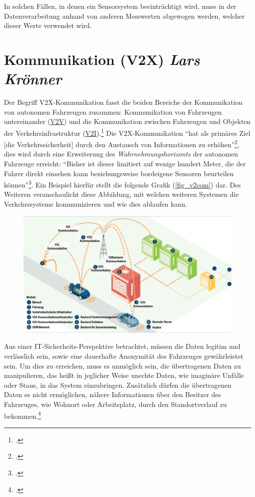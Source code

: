 \documentclass[a4paper, 12pt, openany]{book}
\newcommand\Section[2]{\section[#1 {\scriptsize\itshape#2}]{#1 \footnotesize\itshape#2}}
\begin{document}
                In solchen Fällen, in denen ein Sensorsystem beeinträchtigt wird, muss in der Datenverarbeitung anhand von anderen Messwerten abgewogen werden, welcher dieser Werte verwendet wird.
                
        \Section{Kommunikation (V2X)}{Lars Krönner}
            Der Begriff V2X-Kommunikation fasst die beiden Bereiche der Kommunikation von autonomen Fahrzeugen zusammen: Kommunikation von Fahrzeugen untereinander (\hyperref[V2V]{V2V}) und die Kommunikation zwischen Fahrzeugen und Objekten der Verkehrsinfrastruktur (\hyperref[V2I]{V2I}).\footcite[3]{schmidt2008v2x} Die V2X-Kommunikation \enquote{hat als primäres Ziel [die Verkehrssicherheit] durch den Austausch von Informationen zu erhöhen}\footcite[3]{schmidt2008v2x}, dies wird durch eine Erweiterung des \textit{Wahrnehmungshorizonts} der autonomen Fahrzeuge erreicht: \enquote{Bisher ist dieser limitiert auf wenige hundert Meter, die der Fahrer direkt einsehen kann beziehungsweise bordeigene Sensoren beurteilen können}\footcite[1--15]{schmidt2008v2x}.
            Ein Beispiel hierfür stellt die folgende Grafik (\autoref{fig_v2com}) dar. Des Weiteren veranschaulicht diese Abbildung, mit welchen weiteren Systemen die Verkehrssysteme kommunizieren und wie dies ablaufen kann.
            
            \begin{figure}
                \centering
                \includegraphics[scale=0.25]{v2wasauchimmer.png} 
                \caption{\cite{fig_v2com}}
                \label{fig_v2com}
            \end{figure}  
            
            Aus einer IT-Sicherheits-Perspektive betrachtet, müssen die Daten legitim und verlässlich sein, sowie eine dauerhafte Anonymität des Fahrzeuges gewährleistet sein. Um dies zu erreichen, muss es unmöglich sein, die übertragenen Daten zu manipulieren, das heißt in jeglicher Weise unechte Daten, wie imaginäre Unfälle oder Staus, in das System einzubringen. Zusätzlich dürfen die übertragenen Daten es nicht ermöglichen, nähere Informationen über den Besitzer des Fahrzeuges, wie Wohnort oder Arbeitsplatz, durch den Standortverlauf zu bekommen.\footcite{schmidt2008v2x}
\end{document}
